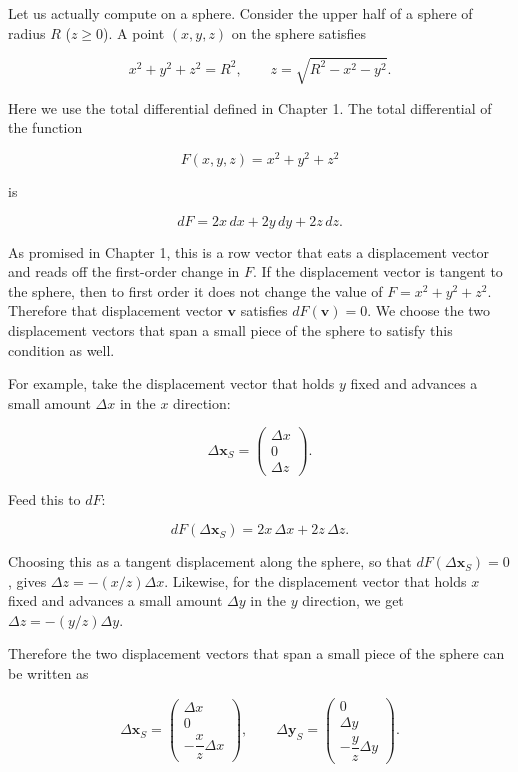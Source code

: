 \documentclass[a4paper,12pt,openany]{book}
\begin{document}
Let us actually compute on a sphere. Consider the upper half of a sphere
of radius \(R\) (\(z \ge 0\)). A point \((x,y,z)\) on the sphere
satisfies

\[x^2+y^2+z^2=R^2,\qquad z=\sqrt{R^2-x^2-y^2}.\]

Here we use the total differential defined in Chapter 1. The total
differential of the function

\[F(x,y,z)=x^2+y^2+z^2\]

is

\[dF=2x\,dx+2y\,dy+2z\,dz.\]

As promised in Chapter 1, this is a row vector that eats a displacement
vector and reads off the first-order change in \(F\). If the
displacement vector is tangent to the sphere, then to first order it
does not change the value of \(F=x^2+y^2+z^2\). Therefore that
displacement vector \(\mathbf{v}\) satisfies \(dF(\mathbf{v})=0\). We
choose the two displacement vectors that span a small piece of the
sphere to satisfy this condition as well.

For example, take the displacement vector that holds \(y\) fixed and
advances a small amount \(\Delta x\) in the \(x\) direction:

\[\Delta\mathbf{x}_S=\begin{pmatrix}\Delta x\\[2pt]0\\[2pt]\Delta z\end{pmatrix}.\]

Feed this to \(dF\):

\[dF(\Delta\mathbf{x}_S)=2x\,\Delta x+2z\,\Delta z.\]

Choosing this as a tangent displacement along the sphere, so that
\(dF(\Delta\mathbf{x}_S)=0\), gives \(\Delta z=-(x/z)\Delta x\).
Likewise, for the displacement vector that holds \(x\) fixed and
advances a small amount \(\Delta y\) in the \(y\) direction, we get
\(\Delta z=-(y/z)\Delta y\).

Therefore the two displacement vectors that span a small piece of the
sphere can be written as

\[\Delta\mathbf{x}_S=\begin{pmatrix}\Delta x\\[2pt]0\\[2pt]-\dfrac{x}{z}\Delta x\end{pmatrix},\qquad
\Delta\mathbf{y}_S=\begin{pmatrix}0\\[2pt]\Delta y\\[2pt]-\dfrac{y}{z}\Delta y\end{pmatrix}.\]
\end{document}
